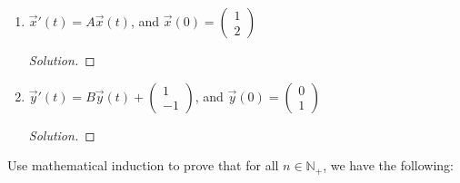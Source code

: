 \documentclass{article}
\newcommand{\N}{\mathbb{N}}
\newenvironment{problem}[2][Problem]{\begin{trivlist}
\item[\hskip \labelsep {\bfseries #1}\hskip \labelsep {\bfseries #2.}]}{\end{trivlist}}
\newenvironment{solution}{\begin{proof}[Solution]}{\end{proof}}
\begin{document}
\begin{enumerate}
    \item[I] $\vec x'(t) = A \vec x(t)$, and $\vec x(0) = \begin{pmatrix}
        1 \\
        2
    \end{pmatrix}$

    \begin{solution}
    \end{solution}

    \item[II] $\vec y'(t) = B \vec y(t) + \begin{pmatrix}
        1 \\
        -1
    \end{pmatrix}$, and $\vec y(0) = \begin{pmatrix}
        0 \\
        1
    \end{pmatrix}$

    \begin{solution}
    \end{solution}

    


\end{enumerate}


\begin{problem}{4}
    Use mathematical induction to prove that for all $n \in \N_+$, we have the following:
\end{problem}
\end{document}
